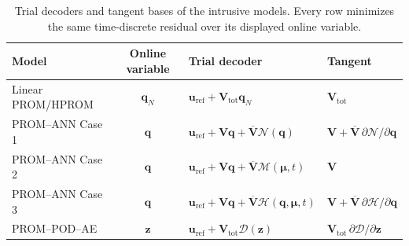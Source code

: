 \documentclass[11pt]{article}
\newcommand{\q}{\mathbf q}
\newcommand{\qp}{\q}
\newcommand{\uvec}{\mathbf u}
\newcommand{\mub}{\bm\mu}
\newcommand{\z}{\mathbf z}
\begin{document}
\begin{table}[H]
\centering
\caption{Trial decoders and tangent bases of the intrusive models.  Every row
minimizes the same time-discrete residual over its displayed online variable.}
\label{tab:trial-maps}
\small
\setlength{\tabcolsep}{4pt}
\renewcommand{\arraystretch}{1.25}
\begin{tabular}{@{}l c l l@{}}
\toprule
Model & Online variable & Trial decoder & Tangent \\
\midrule
Linear PROM/HPROM & $\q_N$ & $\uvec_{\mathrm{ref}}+\mathbf V_{\mathrm{tot}}\q_N$ & $\mathbf V_{\mathrm{tot}}$ \\
PROM--ANN Case 1 & $\qp$ & $\uvec_{\mathrm{ref}}+\mathbf V\qp+\overline{\mathbf V}\mathcal N(\qp)$ & $\mathbf V+\overline{\mathbf V}\,\partial\mathcal N/\partial\qp$ \\
PROM--ANN Case 2 & $\qp$ & $\uvec_{\mathrm{ref}}+\mathbf V\qp+\overline{\mathbf V}\mathcal M(\mub,t)$ & $\mathbf V$ \\
PROM--ANN Case 3 & $\qp$ & $\uvec_{\mathrm{ref}}+\mathbf V\qp+\overline{\mathbf V}\mathcal H(\qp,\mub,t)$ & $\mathbf V+\overline{\mathbf V}\,\partial\mathcal H/\partial\qp$ \\
PROM--POD--AE & $\z$ & $\uvec_{\mathrm{ref}}+\mathbf V_{\mathrm{tot}}\mathcal D(\z)$ & $\mathbf V_{\mathrm{tot}}\,\partial\mathcal D/\partial\z$ \\
\bottomrule
\end{tabular}
\end{table}
\end{document}
